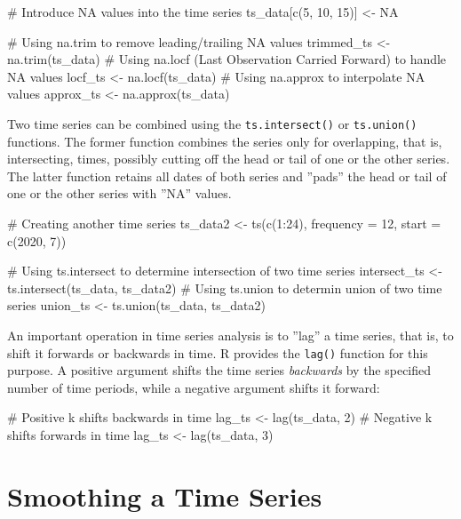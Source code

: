 \begin{samepage}
\begin{Rcode}
# Introduce NA values into the time series
ts_data[c(5, 10, 15)] <- NA

# Using na.trim to remove leading/trailing NA values
trimmed_ts <- na.trim(ts_data)
# Using na.locf (Last Observation Carried Forward) to handle NA values
locf_ts <- na.locf(ts_data)
# Using na.approx to interpolate NA values
approx_ts <- na.approx(ts_data)
\end{Rcode}
\end{samepage}

Two time series can be combined using the \texttt{ts.intersect()} or \texttt{ts.union()} functions. The former function combines the series only for overlapping, that is, intersecting, times, possibly cutting off the head or tail of one or the other series. The latter function retains all dates of both series and ''pads'' the head or tail of one or the other series with ''NA'' values. 

\begin{samepage}
\begin{Rcode}
# Creating another time series
ts_data2 <- ts(c(1:24), frequency = 12, start = c(2020, 7))

# Using ts.intersect to determine intersection of two time series
intersect_ts <- ts.intersect(ts_data, ts_data2)
# Using ts.union to determin union of two time series
union_ts <- ts.union(ts_data, ts_data2)
\end{Rcode}
\end{samepage}

An important operation in time series analysis is to ''lag'' a time series, that is, to shift it forwards or backwards in time. R provides the \texttt{lag()} function for this purpose. A positive argument shifts the time series \emph{backwards} by the specified number of time periods, while a negative argument shifts it forward:

\begin{samepage}
\begin{Rcode}
# Positive k shifts backwards in time
lag_ts <- lag(ts_data, 2)
# Negative k shifts forwards in time
lag_ts <- lag(ts_data, 3)
\end{Rcode}
\end{samepage}

\section{Smoothing a Time Series}

